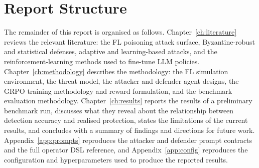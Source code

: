\section{Report Structure}
\label{sec:intro-structure}

The remainder of this report is organised as follows. Chapter~\ref{ch:literature} reviews the relevant literature: the FL poisoning attack surface, Byzantine-robust and statistical defenses, adaptive and learning-based attacks, and the reinforcement-learning methods used to fine-tune LLM policies. Chapter~\ref{ch:methodology} describes the methodology: the FL simulation environment, the threat model, the attacker and defender agent designs, the GRPO training methodology and reward formulation, and the benchmark evaluation methodology. Chapter~\ref{ch:results} reports the results of a preliminary benchmark run, discusses what they reveal about the relationship between detection accuracy and realised protection, states the limitations of the current results, and concludes with a summary of findings and directions for future work. Appendix~\ref{app:prompts} reproduces the attacker and defender prompt contracts and the full operator DSL reference, and Appendix~\ref{app:config} reproduces the configuration and hyperparameters used to produce the reported results.
